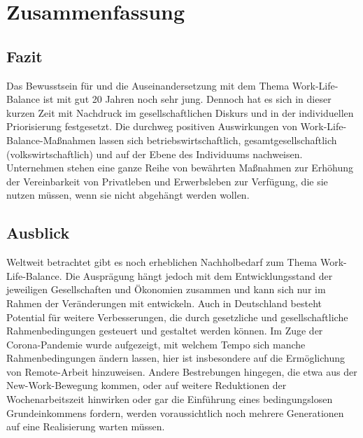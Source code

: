 \chapter{Zusammenfassung}

\nocite{*}


\section{Fazit}

Das Bewusstsein für und die Auseinandersetzung mit dem Thema Work-Life-Balance ist mit gut 20 Jahren noch sehr jung. Dennoch hat es sich in dieser kurzen Zeit mit Nachdruck im gesellschaftlichen Diskurs und in der individuellen Priorisierung festgesetzt. Die durchweg positiven Auswirkungen von Work-Life-Balance-Maßnahmen lassen sich betriebswirtschaftlich, gesamtgesellschaftlich (volkswirtschaftlich) und auf der Ebene des Individuums nachweisen. Unternehmen stehen eine ganze Reihe von bewährten Maßnahmen zur Erhöhung der Vereinbarkeit von Privatleben und Erwerbsleben zur Verfügung, die sie nutzen müssen, wenn sie nicht abgehängt werden wollen.

\section{Ausblick}

Weltweit betrachtet gibt es noch erheblichen Nachholbedarf zum Thema Work-Life-Balance. Die Ausprägung hängt jedoch mit dem Entwicklungsstand der jeweiligen Gesellschaften und Ökonomien zusammen und kann sich nur im Rahmen der Veränderungen mit entwickeln.
Auch in Deutschland besteht Potential für weitere Verbesserungen, die durch gesetzliche und gesellschaftliche Rahmenbedingungen gesteuert und gestaltet werden können. Im Zuge der Corona-Pandemie wurde aufgezeigt, mit welchem Tempo sich manche Rahmenbedingungen ändern lassen, hier ist insbesondere auf die Ermöglichung von Remote-Arbeit hinzuweisen. Andere Bestrebungen hingegen, die etwa aus der New-Work-Bewegung kommen, oder auf weitere Reduktionen der Wochenarbeitszeit hinwirken oder gar die Einführung eines bedingungslosen Grundeinkommens fordern, werden voraussichtlich noch mehrere Generationen auf eine Realisierung warten müssen.


